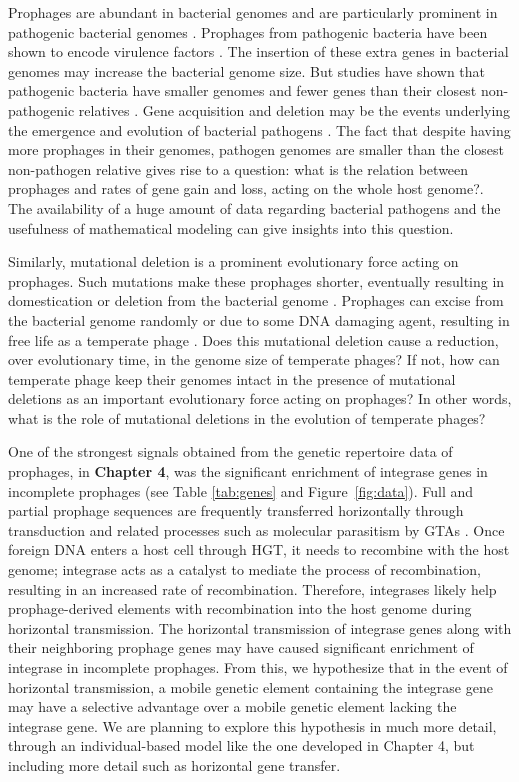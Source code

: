 Prophages are abundant in bacterial genomes and are particularly prominent in pathogenic bacterial genomes \cite{canchaya_impact_2004, brussow_phages_2004}. Prophages from pathogenic bacteria have been shown to encode virulence factors \cite{hyman_bacteriophages_2012}. The insertion of these extra genes in bacterial genomes may increase the bacterial genome size.  But studies have shown that pathogenic bacteria have smaller genomes and fewer genes than their closest non-pathogenic relatives \cite{ moran_microbial_2002, toft_evolutionary_2010}. Gene acquisition and deletion may be the events underlying the emergence and evolution of bacterial pathogens \cite{ochman_genes_2001}. The fact that despite having more prophages in their genomes, pathogen genomes are smaller than the closest non-pathogen relative gives rise to a question: what is the relation between prophages and rates of gene gain and loss, acting on the whole host genome?. The availability of a huge amount of data regarding bacterial pathogens and the usefulness of mathematical modeling can give insights into this question. 

Similarly, mutational deletion is a prominent evolutionary force acting on prophages.  Such mutations make these prophages shorter, eventually resulting in domestication or deletion from the bacterial genome \cite{bobay_pervasive_2014}. Prophages can excise from the bacterial genome randomly or due to some DNA damaging agent, resulting in free life as a temperate phage \cite{nanda_impact_2015}. Does this mutational deletion cause a reduction, over evolutionary time, in the genome size of temperate phages? If not, how can temperate phage keep their genomes intact in the presence of mutational deletions as an important evolutionary force acting on prophages? In other words, what is the role of mutational deletions in the evolution of temperate phages? 

One of the strongest signals obtained from the genetic repertoire data of prophages, in \textbf{Chapter 4}, was the significant enrichment of integrase genes in incomplete prophages (see Table \ref{tab:genes} and Figure~\ref{fig:data}). Full and partial prophage sequences are frequently transferred horizontally through transduction \cite{ fillol-salom_bacteriophages_2019} and related processes such as molecular parasitism by GTAs \cite{lang_gene_2012}. Once foreign DNA enters a host cell through HGT, it needs to recombine with the host genome; integrase acts as a catalyst to mediate the process of recombination, resulting in an increased rate of recombination. Therefore, integrases likely help prophage-derived elements with recombination into the host genome during horizontal transmission. The horizontal transmission of integrase genes along with their neighboring prophage genes may have caused significant enrichment of integrase in incomplete prophages. From this, we hypothesize that in the event of horizontal transmission, a mobile genetic element containing the integrase gene may have a selective advantage over a mobile genetic element lacking the integrase gene. We are planning to explore this hypothesis in much more detail, through an individual-based model like the one developed in Chapter 4, but including more detail such as horizontal gene transfer.


